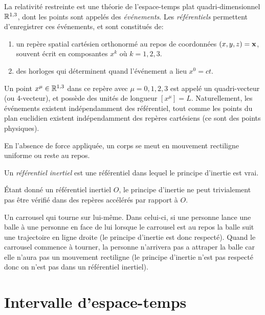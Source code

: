 {La relativité restreinte est une théorie de l'espace-temps plat quadri-dimensionnel $\mathbb{R} ^{1,3}$, dont les points sont appelés des \emph{événements}. Les \emph{référentiels} permettent d'enregistrer ces événements, et sont constitués de:
\begin{enumerate}
    \item un repère spatial cartésien orthonormé au repos de coordonnées $(x, y, z) = \bm{\mathrm{x}}$, souvent écrit en composantes $x^k$ où $k=1, 2, 3$. 
    \item des horloges qui déterminent quand l'événement a lieu $x^0 = ct$. 
\end{enumerate}
Un point $x^\mu\in \mathbb{R}^{1,3}$ dans ce repère avec $\mu=0,1,2,3$ est appelé un quadri-vecteur (ou 4-vecteur), et possède des unités de longueur $[x^\mu ] = L$. Naturellement, les événements existent indépendamment des référentiel, tout comme les points du plan euclidien existent indépendamment des repères cartésiens (ce sont des points physiques).
\begin{theoremframe}
\begin{rap}
    En l'absence de force appliquée, un corps se meut en mouvement rectiligne uniforme ou reste au repos.    
\end{rap}
\end{theoremframe}
\begin{theoremframe}
\begin{defi}
Un \emph{référentiel inertiel} est une référentiel dans lequel le principe d'inertie est vrai. 
\end{defi}
\end{theoremframe}
Étant donné un référentiel inertiel $O$, le principe d'inertie ne peut trivialement pas être vérifié dans des repères accélérés par rapport à $O$. 

\begin{exmp}
    Un carrousel qui tourne sur lui-même. Dans celui-ci, si une personne lance une balle à une personne en face de lui lorsque le carrousel est au repos la balle suit une trajectoire en ligne droite (le principe d'inertie est donc respecté). Quand le carrousel commence à tourner, la personne n'arrivera pas a attraper la balle car elle n'aura pas un mouvement rectiligne (le principe d'inertie n'est pas respecté donc on n'est pas dans un référentiel inertiel).
\end{exmp}


\section{Intervalle d'espace-temps}

}
